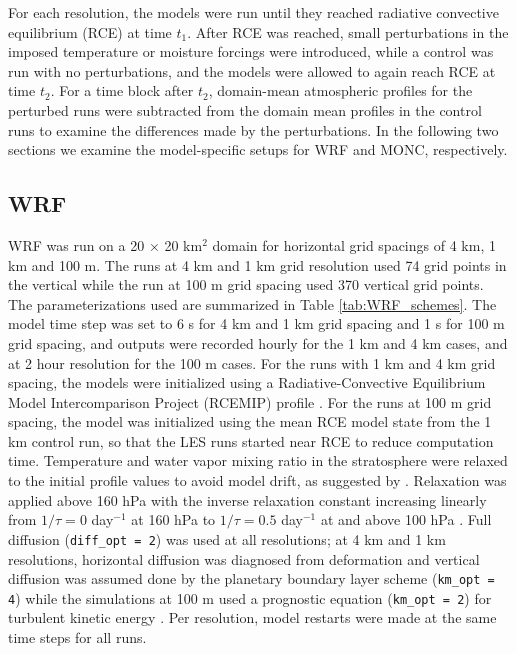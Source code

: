 \documentclass[draft]{agujournal2019}
\begin{document}
For each resolution, the models were run until they reached radiative convective
equilibrium (RCE) at time $t_1$. After RCE was reached, small perturbations in
the imposed temperature or moisture forcings were introduced, while a control
was run with no perturbations, and the models were allowed to again reach RCE at
time $t_2$. For a time block after $t_2$, domain-mean atmospheric profiles for
the perturbed runs were subtracted from the domain mean profiles in the control
runs to examine the differences made by the perturbations. In the following two
sections we examine the model-specific setups for WRF and MONC, respectively.

\subsection{WRF}

WRF was run on a 20 $\times$ 20 km$^2$ domain for horizontal grid spacings of 4
km, 1 km and 100 m. The runs at 4 km and 1 km grid resolution used 74 grid
points in the vertical while the run at 100 m grid spacing used 370 vertical
grid points. The parameterizations used are summarized in Table
\ref{tab:WRF_schemes}. The model time step was set to 6 s for 4 km and 1 km grid
spacing and 1 s for 100 m grid spacing, and outputs were recorded hourly for the
1 km and 4 km cases, and at 2 hour resolution for the 100 m cases. For the runs
with 1 km and 4 km grid spacing, the models were initialized using a
Radiative-Convective Equilibrium Model Intercomparison Project (RCEMIP) profile
\cite{Wing_GMD_2018}. For the runs at 100 m grid spacing, the model was
initialized using the mean RCE model state from the 1 km control run, so that
the LES runs started near RCE to reduce computation time. Temperature and water
vapor mixing ratio in the stratosphere were relaxed to the initial profile
values to avoid model drift, as suggested by .
Relaxation was applied above 160 hPa with the inverse relaxation constant
increasing linearly from $1/\tau = 0$ day$^{-1}$ at 160 hPa to $1/\tau = 0.5$
day$^{-1}$ at and above 100 hPa \cite{Herman_JAMES_2013}. Full diffusion
(\texttt{diff\_opt = 2}) was used at all resolutions; at 4 km and 1 km
resolutions, horizontal diffusion was diagnosed from deformation and vertical
diffusion was assumed done by the planetary boundary layer scheme
(\texttt{km\_opt = 4}) while the simulations at 100 m used a prognostic equation
(\texttt{km\_opt = 2}) for turbulent kinetic energy \cite{Skamarock_2019}. Per
resolution, model restarts were made at the same time steps for all runs.
\end{document}
